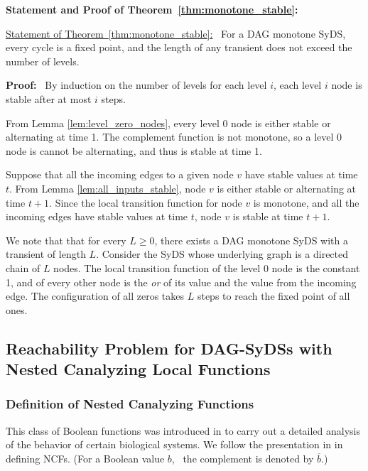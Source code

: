 \medskip

\noindent
\textbf{Statement and Proof of Theorem~\ref{thm:monotone_stable}:}

\medskip

\noindent
\underline{Statement of Theorem~\ref{thm:monotone_stable}:}~
For a DAG monotone SyDS, every cycle is a fixed point, 
and the length of any transient does not exceed the number of levels.

\medskip

\noindent
\textbf{Proof:}~ 
By induction on the number of levels for each level $i$, 
each level $i$ node is stable after at most $i$ steps.

From Lemma \ref{lem:level_zero_nodes}, every level 0 node is either
stable or alternating  at time 1.  The complement function is not
monotone, so a  level 0 node is cannot be alternating, and thus is
stable at time 1.

Suppose that all the incoming edges to a given node $v$ have stable
values at time $t$.  From Lemma \ref{lem:all_inputs_stable}, node
$v$ is either stable or alternating  at time $t+1$.  Since the local
transition function for node $v$ is monotone, and all the incoming
edges have stable values at time $t$, node $v$ is stable at time
$t+1$. \QED

We note that that for every $L \geq 0$, there exists a DAG
monotone SyDS with a transient of length $L$.  Consider the SyDS
whose underlying graph is a directed chain of $L$ nodes.  The local
transition function of the level 0 node is the constant 1, and of
every other node is the {\em or} of its value and the value from
the incoming edge.  The configuration of all zeros takes $L$ steps
to reach the fixed point of all ones.


\subsection{Reachability Problem for DAG-SyDSs with Nested Canalyzing Local Functions}
\label{asec:reach_ncf}

\bigskip

\subsubsection{Definition of Nested Canalyzing Functions}

\medskip

This class of Boolean functions 
was introduced in \cite{Kauffman-etal-2003} to carry out a detailed
analysis of the behavior of certain biological systems.
We follow the presentation in \cite{Layne-2011} in defining NCFs.
(For a Boolean value $b$,~ the complement is denoted by $\overline{b}$.)

